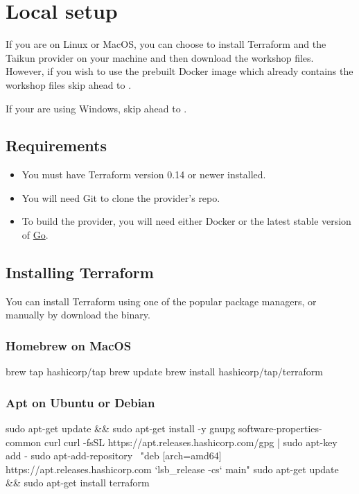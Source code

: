 \section{Local setup}

If you are on Linux or MacOS,
you can choose to install Terraform and the Taikun provider on your machine and
then download the workshop files.
However, if you wish to use the prebuilt Docker image which already contains
the workshop files skip ahead to .

\begin{warn}
If your are using Windows, skip ahead to .
\end{warn}

\subsection{Requirements}
\begin{itemize}
  \item You must have Terraform version 0.14 or newer installed.
  \item You will need Git to clone the provider's repo.
  \item To build the provider, you will need either Docker or
    the latest stable version of \href{https://golang.org/dl/}{Go}.
\end{itemize}

\subsection{Installing Terraform}
You can install Terraform using one of the popular package managers, or manually by
download the binary.
\subsubsection{Homebrew on MacOS}
\begin{shell}
brew tap hashicorp/tap
brew update
brew install hashicorp/tap/terraform
\end{shell}

\subsubsection{Apt on Ubuntu or Debian}
\begin{shell}
sudo apt-get update && sudo apt-get install -y gnupg software-properties-common curl
curl -fsSL https://apt.releases.hashicorp.com/gpg | sudo apt-key add -
sudo apt-add-repository \
"deb [arch=amd64] https://apt.releases.hashicorp.com `lsb_release -cs` main"
sudo apt-get update && sudo apt-get install terraform
\end{shell}


